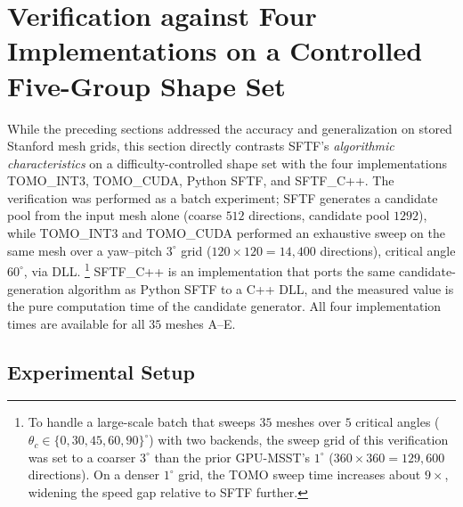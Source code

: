 \documentclass[11pt,a4paper]{article}
\begin{document}
\section{Verification against Four Implementations on a Controlled Five-Group Shape Set}
\label{sec:fivegroup}

While the preceding sections addressed the accuracy and generalization on stored Stanford mesh grids,
this section directly contrasts SFTF's \emph{algorithmic characteristics} on a difficulty-controlled shape set
with the four implementations TOMO\_INT3, TOMO\_CUDA, Python SFTF, and SFTF\_C++.
The verification was performed as a batch experiment;
SFTF generates a candidate pool from the input mesh alone (coarse $512$ directions, candidate pool $1292$),
while TOMO\_INT3 and TOMO\_CUDA performed an exhaustive sweep on the same mesh over a yaw--pitch $3^\circ$ grid
($120\times120=14{,}400$ directions), critical angle $60^\circ$, via DLL.%
\footnote{To handle a large-scale batch that sweeps $35$ meshes over $5$ critical angles ($\theta_c\in\{0,30,45,60,90\}^\circ$) with two backends,
the sweep grid of this verification was set to a coarser $3^\circ$ than the prior GPU-MSST's $1^\circ$
($360\times360=129{,}600$ directions). On a denser $1^\circ$ grid, the TOMO sweep time increases about $9\times$, widening the speed gap relative to SFTF further.}
SFTF\_C++ is an implementation that ports the same candidate-generation algorithm as Python SFTF to a C++ DLL,
and the measured value is the pure computation time of the candidate generator.
All four implementation times are available for all $35$ meshes A--E.

\subsection{Experimental Setup}
\end{document}
